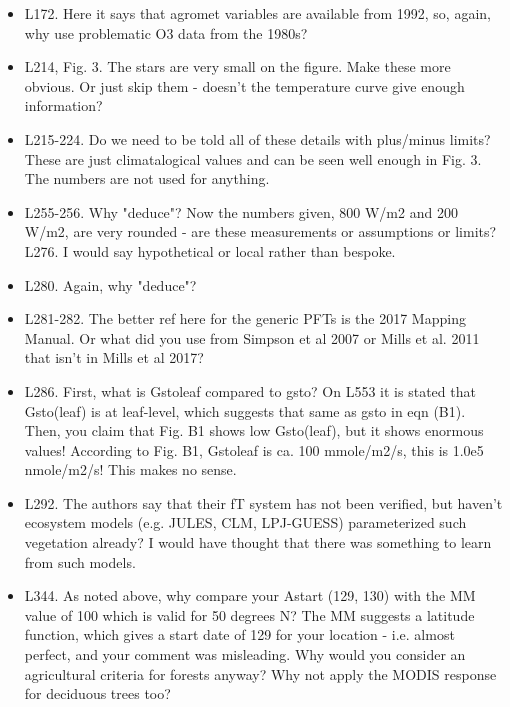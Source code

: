 \documentclass{scrartcl}
\begin{document}
\begin{itemize}
\item {\color{blue}L172. Here it says that agromet variables are available from 1992, so, again, why use problematic O3 data from the 1980s?}

\item {\color{blue}L214, Fig. 3. The stars are very small on the figure. Make these more obvious. Or just skip them - doesn't the temperature curve give enough information?}

\item {\color{blue}L215-224. Do we need to be told all of these details with plus/minus limits? These are just climatalogical values and can be seen well enough in Fig. 3. The numbers are not used for anything.}

\item {\color{blue}L255-256. Why "deduce"? Now the numbers given, 800 W/m2 and 200 W/m2, are very rounded - are these measurements or assumptions or limits?
L276. I would say hypothetical or local rather than bespoke.}

\item {\color{blue}L280. Again, why "deduce"?}

\item {\color{blue}L281-282. The better ref here for the generic PFTs is the 2017 Mapping Manual. Or what did you use from Simpson et al 2007 or Mills et al. 2011 that isn't in Mills et al 2017?}

\item {\color{blue}L286. First, what is Gstoleaf compared to gsto? On L553 it is stated that Gsto(leaf) is at leaf-level, which suggests that same as gsto in eqn (B1). Then, you claim that Fig. B1 shows low Gsto(leaf), but it shows enormous values! According to Fig. B1, Gstoleaf is ca. 100 mmole/m2/s, this is 1.0e5 nmole/m2/s! This makes no sense.}

\item {\color{blue}L292. The authors say that their fT system has not been verified, but haven't ecosystem models (e.g. JULES, CLM, LPJ-GUESS) parameterized such vegetation already? I would have thought that there was something to learn from such models.}

\item {\color{blue}L344. As noted above, why compare your Astart (129, 130) with the MM value of 100 which is valid for 50 degrees N? The MM suggests a latitude function, which gives a start date of 129 for your location - i.e. almost perfect, and your comment was misleading. Why would you consider an agricultural criteria for forests anyway? Why not apply the MODIS response for deciduous trees too?}


\end{itemize}
\end{document}
